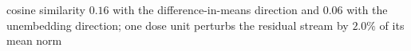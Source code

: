 cosine similarity $0.16$ with the difference-in-means direction and $0.06$ with the unembedding direction; one dose unit perturbs the residual stream by $2.0\%$ of its mean norm